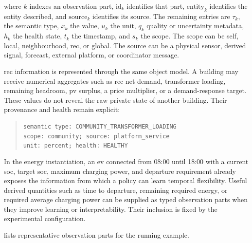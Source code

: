 where $k$ indexes an observation part, $\mathrm{id}_k$ identifies that part, $\mathrm{entity}_k$ identifies the entity described, and $\mathrm{source}_k$ identifies its source. The remaining entries are $\tau_k$, the semantic type, $x_k$ the value, $u_k$ the unit, $q_k$ quality or uncertainty metadata, $h_k$ the health state, $t_k$ the timestamp, and $s_k$ the scope. The scope can be self, local, neighbourhood, \gls{rec}, or global. The source can be a physical sensor, derived signal, forecast, external platform, or coordinator message.

\gls{rec} information is represented through the same object model. A building may receive numerical aggregates such as \gls{rec} net demand, transformer loading, remaining headroom, \gls{pv} surplus, a price multiplier, or a demand-response target. These values do not reveal the raw private state of another building. Their provenance and health remain explicit:

\begin{quote}\small
\begin{minipage}{\linewidth}
\texttt{semantic type: COMMUNITY\_TRANSFORMER\_LOADING}\\
\texttt{scope: community; source: platform\_service}\\
\texttt{unit: percent; health: HEALTHY}
\end{minipage}
\end{quote}

In the energy instantiation, an \gls{ev} connected from 08:00 until 18:00 with a current \gls{soc}, target \gls{soc}, maximum charging power, and departure requirement already exposes the information from which a policy can learn temporal flexibility. Useful derived quantities such as time to departure, remaining required energy, or required average charging power can be supplied as typed observation parts when they improve learning or interpretability. Their inclusion is fixed by the experimental configuration.

 lists representative observation parts for the running example.

